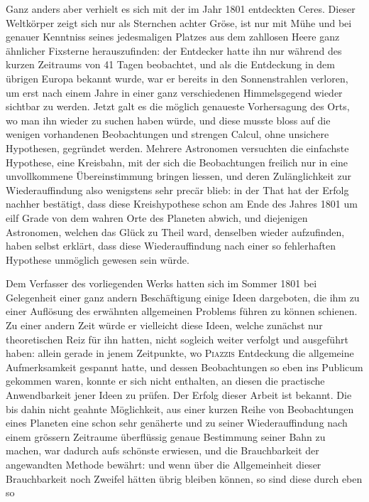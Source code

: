 Ganz anders aber verhielt es sich mit der im Jahr 1801 entdeckten Ceres. Dieser Weltkörper zeigt sich nur als Sternchen achter Gröse, ist nur mit Mühe und bei genauer Kenntniss seines jedesmaligen Platzes aus dem zahllosen Heere ganz ähnlicher Fixsterne herauszufinden: der Entdecker hatte ihn nur während des kurzen Zeitraums von 41 Tagen beobachtet, und als die Entdeckung in dem übrigen Europa bekannt wurde, war er bereits in den Sonnenstrahlen verloren, um erst nach einem Jahre in einer ganz verschiedenen Himmelsgegend wieder sichtbar zu werden. Jetzt galt es die möglich genaueste Vorhersagung des Orts, wo man ihn wieder zu suchen haben würde, und diese musste bloss auf die wenigen vorhandenen Beobachtungen und strengen Calcul, ohne unsichere Hypothesen, gegründet werden. Mehrere Astronomen versuchten die einfachste Hypothese, eine Kreisbahn, mit der sich die Beobachtungen freilich nur in eine unvollkommene Übereinstimmung bringen liessen, und deren Zulänglichkeit zur Wiederauffindung also wenigstens sehr precär blieb: in der That hat der Erfolg nachher bestätigt, dass diese Kreishypothese schon am Ende des Jahres 1801 um eilf Grade von dem wahren Orte des Planeten abwich, und diejenigen Astronomen, welchen das Glück zu Theil ward, denselben wieder aufzufinden, haben selbst erklärt, dass diese Wiederauffindung nach einer so fehlerhaften Hypothese unmöglich gewesen sein würde.

Dem Verfasser des vorliegenden Werks hatten sich im Sommer 1801 bei Gelegenheit einer ganz andern Beschäftigung einige Ideen dargeboten, die ihm zu einer Auflösung des erwähnten allgemeinen Problems führen zu können schienen. Zu einer andern Zeit würde er vielleicht diese Ideen, welche zunächst nur theoretischen Reiz für ihn hatten, nicht sogleich weiter verfolgt und ausgeführt haben: allein gerade in jenem Zeitpunkte, wo \textsc{Piazzis} Entdeckung die allgemeine Aufmerksamkeit gespannt hatte, und dessen Beobachtungen so eben ins Publicum gekommen waren, konnte er sich nicht enthalten, an diesen die practische Anwendbarkeit jener Ideen zu prüfen. Der Erfolg dieser Arbeit ist bekannt. Die bis dahin nicht geahnte Möglichkeit, aus einer kurzen Reihe von Beobachtungen eines Planeten eine schon sehr genäherte und zu seiner Wiederauffindung nach einem grössern Zeitraume überflüssig genaue Bestimmung seiner Bahn zu machen, war dadurch aufs schönste erwiesen, und die Brauchbarkeit der angewandten Methode bewährt: und wenn über die Allgemeinheit dieser Brauchbarkeit noch Zweifel hätten übrig bleiben können, so sind diese durch eben so
